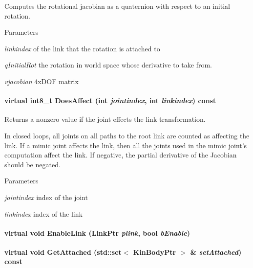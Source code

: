 Computes the rotational jacobian as a quaternion with respect to an initial rotation. 


\begin{DoxyParams}{Parameters}
\item[{\em linkindex}]of the link that the rotation is attached to \item[{\em qInitialRot}]the rotation in world space whose derivative to take from. \item[{\em vjacobian}]4xDOF matrix \end{DoxyParams}
\hypertarget{classOpenRAVE_1_1KinBody_ae63c68d8042f54cfb86ef6b52827cb69}{
\paragraph[{DoesAffect}]{\setlength{\rightskip}{0pt plus 5cm}virtual int8\_\-t DoesAffect (int {\em jointindex}, \/  int {\em linkindex}) const}\hfill}
\label{classOpenRAVE_1_1KinBody_ae63c68d8042f54cfb86ef6b52827cb69}


Returns a nonzero value if the joint effects the link transformation. 

In closed loops, all joints on all paths to the root link are counted as affecting the link. If a mimic joint affects the link, then all the joints used in the mimic joint's computation affect the link. If negative, the partial derivative of the Jacobian should be negated. 
\begin{DoxyParams}{Parameters}
\item[{\em jointindex}]index of the joint \item[{\em linkindex}]index of the link \end{DoxyParams}
\hypertarget{classOpenRAVE_1_1KinBody_af0009d4f176dc8f0d02c5dd3b96226f1}{
\paragraph[{EnableLink}]{\setlength{\rightskip}{0pt plus 5cm}virtual void EnableLink (LinkPtr {\em plink}, \/  bool {\em bEnable})}\hfill}
\label{classOpenRAVE_1_1KinBody_af0009d4f176dc8f0d02c5dd3b96226f1}
\hypertarget{classOpenRAVE_1_1KinBody_a2f50259e5dc09090474e2099dbd81cac}{
\paragraph[{GetAttached}]{\setlength{\rightskip}{0pt plus 5cm}virtual void GetAttached (std::set$<$ KinBodyPtr $>$ \& {\em setAttached}) const}\hfill}
\label{classOpenRAVE_1_1KinBody_a2f50259e5dc09090474e2099dbd81cac}



